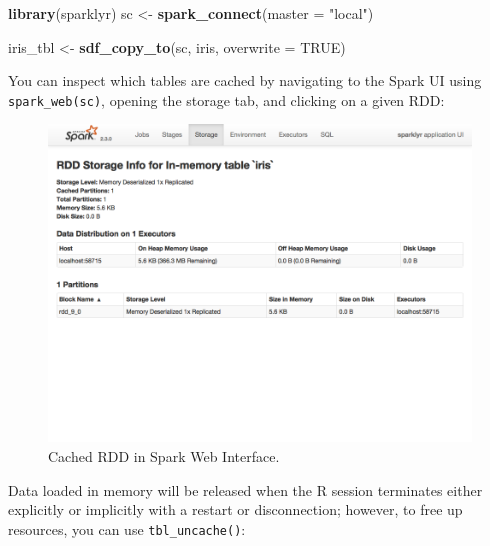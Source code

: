\documentclass[]{book}
\newenvironment{Shaded}{\begin{snugshade}}{\end{snugshade}}
\newcommand{\DataTypeTok}[1]{\textcolor[rgb]{0.13,0.29,0.53}{#1}}
\newcommand{\KeywordTok}[1]{\textcolor[rgb]{0.13,0.29,0.53}{\textbf{#1}}}
\newcommand{\NormalTok}[1]{#1}
\newcommand{\OtherTok}[1]{\textcolor[rgb]{0.56,0.35,0.01}{#1}}
\newcommand{\StringTok}[1]{\textcolor[rgb]{0.31,0.60,0.02}{#1}}
\theoremstyle{definition}
\theoremstyle{definition}
\theoremstyle{definition}
\theoremstyle{remark}
\begin{document}
\begin{Shaded}
\begin{Highlighting}[]
\KeywordTok{library}\NormalTok{(sparklyr)}
\NormalTok{sc <-}\StringTok{ }\KeywordTok{spark_connect}\NormalTok{(}\DataTypeTok{master =} \StringTok{"local"}\NormalTok{)}
\end{Highlighting}
\end{Shaded}

\begin{Shaded}
\begin{Highlighting}[]
\NormalTok{iris_tbl <-}\StringTok{ }\KeywordTok{sdf_copy_to}\NormalTok{(sc, iris, }\DataTypeTok{overwrite =} \OtherTok{TRUE}\NormalTok{)}
\end{Highlighting}
\end{Shaded}

You can inspect which tables are cached by navigating to the Spark UI
using \texttt{spark\_web(sc)}, opening the storage tab, and clicking on
a given RDD:

\begin{figure}

{\centering \includegraphics[width=13.78in]{images/07-tuning-cache-rdd-web} 

}

\caption{Cached RDD in Spark Web Interface.}\label{fig:spark-standalone-rdd-web}
\end{figure}

Data loaded in memory will be released when the R session terminates
either explicitly or implicitly with a restart or disconnection;
however, to free up resources, you can use \texttt{tbl\_uncache()}:
\end{document}
